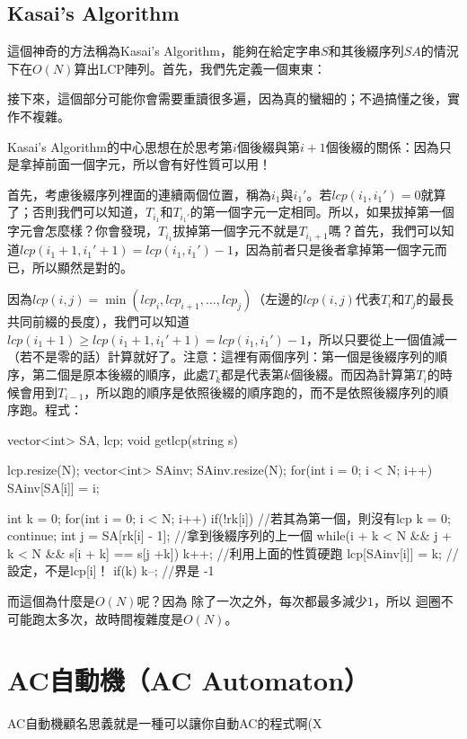 \documentclass[main.tex]{subfiles}
\begin{document}
		\subsection{Kasai's Algorithm}
			這個神奇的方法稱為Kasai's Algorithm，能夠在給定字串$S$和其後綴序列$SA$的情況下在$O(N)$算出LCP陣列。首先，我們先定義一個東東：
			
			接下來，這個部分可能你會需要重讀很多遍，因為真的蠻細的；不過搞懂之後，實作不複雜。
			
			Kasai's Algorithm的中心思想在於思考第$i$個後綴與第$i + 1$個後綴的關係：因為只是拿掉前面一個字元，所以會有好性質可以用！
			
			首先，考慮後綴序列裡面的連續兩個位置，稱為$i_1$與$i_1'$。若$lcp(i_1, i_1') = 0$就算了；否則我們可以知道，$T_{i_1}$和$T_{i_1'}$的第一個字元一定相同。所以，如果拔掉第一個字元會怎麼樣？你會發現，$T_{i_1}$拔掉第一個字元不就是$T_{i_1 + 1}$嗎？首先，我們可以知道$lcp(i_1 + 1, i_1' + 1) = lcp(i_1, i_1') - 1$，因為前者只是後者拿掉第一個字元而已，所以顯然是對的。
			
			因為$lcp(i, j) = \min(lcp_i, lcp_{i + 1}, \dots, lcp_{j})$（左邊的$lcp(i, j)$代表$T_i$和$T_j$的最長共同前綴的長度），我們可以知道$lcp(i_1 + 1) \geq lcp(i_1 + 1, i_1' + 1) =lcp(i_1, i_1') - 1$，所以只要從上一個值減一（若不是零的話）計算就好了。注意：這裡有兩個序列：第一個是後綴序列的順序，第二個是原本後綴的順序，此處$T_k$都是代表第$k$個後綴。而因為計算第$T_i$的時候會用到$T_{i -1 }$，所以跑的順序是依照後綴的順序跑的，而不是依照後綴序列的順序跑。程式：
			\begin{C++}
vector<int> SA, lcp;
void getlcp(string s){
	lcp.resize(N);
	vector<int> SAinv;
	SAinv.resize(N);
	for(int i = 0; i < N; i++){
		SAinv[SA[i]] = i;
	}

	int k = 0;
	for(int i = 0; i < N; i++){
		if(!rk[i]){ //若其為第一個，則沒有lcp
			k = 0;
			continue;
		}
		int j = SA[rk[i] - 1]; //拿到後綴序列的上一個
		while(i + k < N && j + k < N && s[i + k] == s[j +k])  		
			k++;  //利用上面的性質硬跑
		lcp[SAinv[i]] = k; //設定，不是lcp[i]！
		if(k) k--; //界是 -1
	}
}
			\end{C++}
		而這個為什麼是$O(N)$呢？因為 除了一次之外，每次都最多減少$1$，所以 迴圈不可能跑太多次，故時間複雜度是$O(N)$。

\section{AC自動機（AC Automaton）}
AC自動機顧名思義就是一種可以讓你自動AC的程式啊(X\\
\end{document}
